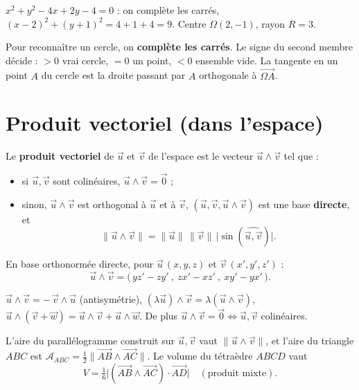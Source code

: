\begin{exemple}
$x^{2}+y^{2}-4x+2y-4=0$ : on complète les carrés,
$(x-2)^{2}+(y+1)^{2}=4+1+4=9$. Centre $\Omega(2,-1)$, rayon $R=3$.
\end{exemple}

\begin{aretenir}
Pour reconnaître un cercle, on \textbf{complète les carrés}. Le signe du second membre
décide : $>0$ vrai cercle, $=0$ un point, $<0$ ensemble vide. La tangente en un point
$A$ du cercle est la droite passant par $A$ orthogonale à $\overrightarrow{\Omega A}$.
\end{aretenir}

\section{Produit vectoriel (dans l'espace)}

\begin{definition}
Le \textbf{produit vectoriel} de $\vec u$ et $\vec v$ de l'espace est le vecteur $\vec u\wedge\vec v$ tel que :
\begin{itemize}
\item si $\vec u,\vec v$ sont colinéaires, $\vec u\wedge\vec v=\vec 0$ ;
\item sinon, $\vec u\wedge\vec v$ est orthogonal à $\vec u$ et à $\vec v$, $(\vec u,\vec v,\vec u\wedge\vec v)$
est une base \textbf{directe}, et
\[
\|\vec u\wedge\vec v\|=\|\vec u\|\,\|\vec v\|\,\big|\sin(\widehat{\vec u,\vec v})\big|.
\]
\end{itemize}
\end{definition}

\begin{propriete}
En base orthonormée directe, pour $\vec u\,(x,y,z)$ et $\vec v\,(x',y',z')$ :
\[
\vec u\wedge\vec v=\big(\,yz'-zy'\ ,\ zx'-xz'\ ,\ xy'-yx'\,\big).
\]
\end{propriete}

\begin{propriete}
$\vec u\wedge\vec v=-\,\vec v\wedge\vec u$ (antisymétrie),
$(\lambda\vec u)\wedge\vec v=\lambda(\vec u\wedge\vec v)$,
$\vec u\wedge(\vec v+\vec w)=\vec u\wedge\vec v+\vec u\wedge\vec w$.
De plus $\vec u\wedge\vec v=\vec 0 \iff \vec u,\vec v$ colinéaires.
\end{propriete}

\begin{theoreme}
L'aire du parallélogramme construit sur $\vec u,\vec v$ vaut $\|\vec u\wedge\vec v\|$, et
l'aire du triangle $ABC$ est $\mathcal A_{ABC}=\tfrac12\big\|\overrightarrow{AB}\wedge\overrightarrow{AC}\big\|$.
Le volume du tétraèdre $ABCD$ vaut
\[
V=\tfrac16\big|(\overrightarrow{AB}\wedge\overrightarrow{AC})\cdot\overrightarrow{AD}\big|
\quad(\text{produit mixte}).
\]
\end{theoreme}

